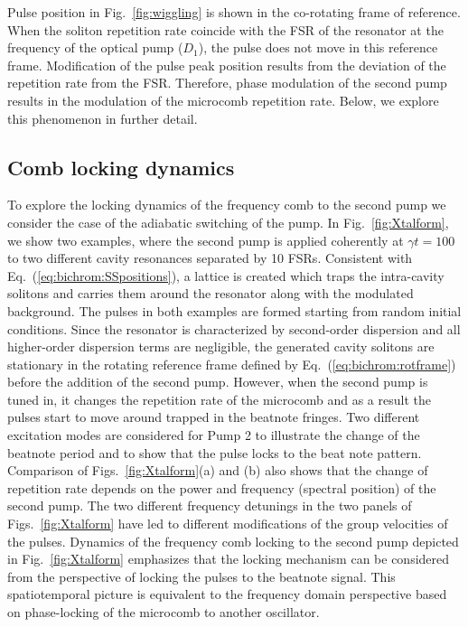 Pulse position in Fig.~\ref{fig:wiggling} is shown in the co-rotating frame of reference. When the soliton repetition rate coincide with the FSR of the resonator at the frequency of the optical pump ($D_1$), the pulse does not move in this reference frame. Modification of the pulse peak position results from the deviation of the repetition rate from the FSR. Therefore, phase modulation of the second pump results in the modulation of the microcomb repetition rate. Below, we explore this phenomenon in further detail.

\subsection{Comb locking dynamics}

To explore the locking dynamics of the frequency comb to the second pump we consider the case of the adiabatic switching of the pump. In Fig.~\ref{fig:Xtalform}, we show two examples, where the second pump is applied coherently at $\gamma t = 100$ to two different cavity resonances separated by 10 FSRs. Consistent with Eq.~(\ref{eq:bichrom:SSpositions}), a lattice is created which traps the intra-cavity solitons and carries them around the resonator along with the modulated background. The pulses in both examples are formed starting from random initial conditions. Since the resonator is characterized by second-order dispersion and all higher-order dispersion terms are negligible, the generated cavity solitons are stationary in the rotating reference frame defined by Eq.~(\ref{eq:bichrom:rotframe}) before the addition of the second pump. However, when the second pump is tuned in, it changes the repetition rate of the microcomb and as a result the pulses start to move around trapped in the beatnote fringes. Two different excitation modes are considered for Pump 2 to illustrate the change of the beatnote period and to show that the pulse locks to the beat note pattern. Comparison of Figs.~\ref{fig:Xtalform}(a) and (b) also shows that the change of repetition rate depends on the power and frequency (spectral position) of the second pump. The two different frequency detunings in the two panels of Figs.~\ref{fig:Xtalform} have led to different modifications of the group velocities of the pulses. Dynamics of the frequency comb locking to the second pump depicted in Fig.~\ref{fig:Xtalform} emphasizes that the locking mechanism can be considered from the perspective of locking the pulses to the beatnote signal. This spatiotemporal picture is equivalent to the frequency domain perspective based on phase-locking of the microcomb to another oscillator.
